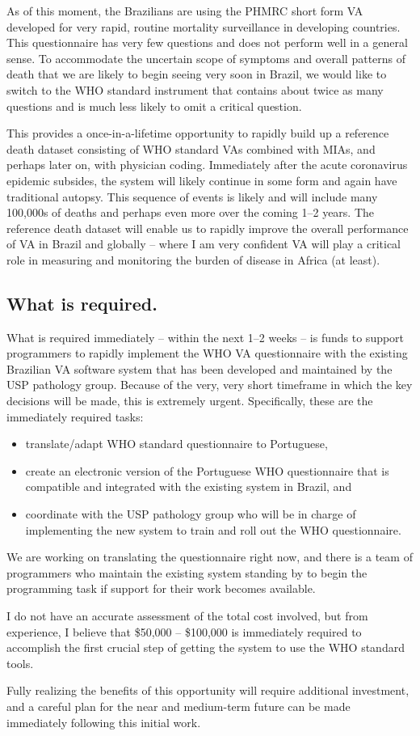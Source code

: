 \documentclass[12pt]{article}
\begin{document}
As of this moment, the Brazilians are using the PHMRC short form VA developed for very rapid, routine mortality surveillance in developing countries. This questionnaire has very few questions and does not perform well in a general sense. To accommodate the uncertain scope of symptoms and overall patterns of death that we are likely to begin seeing very soon in Brazil, we would like to switch to the WHO standard instrument that contains about twice as many questions and is much less likely to omit a critical question. 

This provides a once-in-a-lifetime opportunity to rapidly build up a reference death dataset consisting of WHO standard VAs combined with MIAs, and perhaps later on, with physician coding.  Immediately after the acute coronavirus epidemic subsides, the system will likely continue in some form and again have traditional autopsy. This sequence of events is likely and will include many 100,000s of deaths and perhaps even more over the coming 1--2 years.  The reference death dataset will enable us to rapidly improve the overall performance of VA in Brazil and globally -- where I am very confident VA will play a critical role in measuring and monitoring the burden of disease in Africa (at least).

\subsection{What is required.}

What is required immediately -- within the next 1--2 weeks -- is funds to support programmers to rapidly implement the WHO VA questionnaire with the existing Brazilian VA software system that has been developed and maintained by the USP pathology group.  Because of the very, very short timeframe in which the key decisions will be made, this is extremely urgent.  Specifically, these are the immediately required tasks:
\begin{itemize}
\item translate/adapt WHO standard questionnaire to Portuguese,
\item create an electronic version of the Portuguese WHO questionnaire that is compatible and integrated with the existing system in Brazil, and
\item coordinate with the USP pathology group who will be in charge of implementing the new system to train and roll out the WHO questionnaire.
\end{itemize}
We are working on translating the questionnaire right now, and there is a team of programmers who maintain the existing system standing by to begin the programming task if support for their work becomes available.  

I do not have an accurate assessment of the total cost involved, but from experience, I believe that \$50,000 -- \$100,000 is immediately required to accomplish the first crucial step of getting the system to use the WHO standard tools.  

Fully realizing the benefits of this opportunity will require additional investment, and a careful plan for the near and medium-term future can be made immediately following this initial work. 
\end{document}
